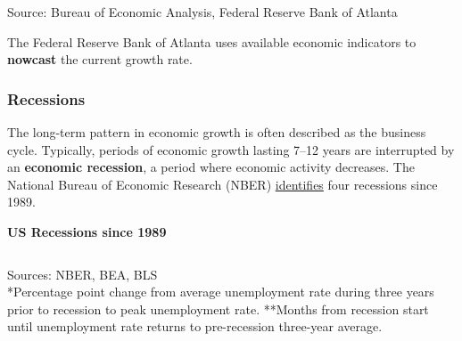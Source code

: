 \documentclass{report}
\newcommand{\tbllink}[1]{\href{https://raw.githubusercontent.com/bdecon/US-chartbook/master/chartbook/data/#1}{\faTable}}
\begin{document}
\begin{minipage}{1.0\textwidth}
\footnotesize{Source: Bureau of Economic Analysis, Federal Reserve Bank of Atlanta} \hfill \tbllink{gdp.csv}
\vspace{1mm}

\small  

The Federal Reserve Bank of Atlanta uses available economic indicators to \textbf{nowcast} the current growth rate. 
\end{minipage}
\newpage
\begin{minipage}{1.0\textwidth}
\subsubsection*{Recessions}
\vspace{-1mm}

\small The long-term pattern in economic growth is often described as the business cycle. Typically, periods of economic growth lasting 7--12 years are interrupted by an \textbf{economic recession}, a period where economic activity decreases. The National Bureau of Economic Research (NBER) \href{https://www.nber.org/research/business-cycle-dating}{identifies} four recessions since 1989.


\vspace{0.5mm}

\normalsize \textbf{US Recessions since 1989}
\vspace{-4mm}

\footnotesize {} \setlength{\tabcolsep}{1.0pt} \color{black!90}
	{\renewcommand{\arraystretch}{1.62}
\hspace*{-2mm} \begin{tabular}{p{29mm} C{16mm} C{16mm} C{13.2mm} C{13.2mm} C{13.2mm} C{13.2mm}}
		 \hline
	\end{tabular}}
	\vspace{-1mm}
	
\footnotesize{Sources: NBER, BEA, BLS}\\
\footnotesize{*Percentage point change from average unemployment rate during three years prior to recession to peak unemployment rate. **Months from recession start until unemployment rate returns to pre-recession three-year average.}
\vspace{5mm}


\end{minipage}
\end{document}
